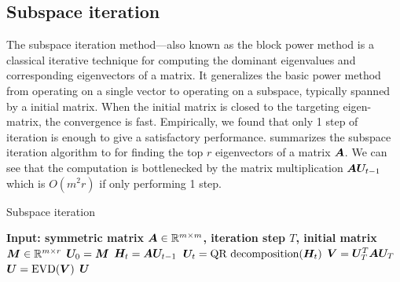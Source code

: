 \subsection{Subspace iteration}
\label{subapp: background subspace iteration}
The subspace iteration method—also known as the block power method is a classical iterative technique for computing the dominant eigenvalues and corresponding eigenvectors of a matrix. It generalizes the basic power method from operating on a single vector to operating on a subspace, typically spanned by a initial matrix. When the initial matrix is closed to the targeting eigen-matrix, the convergence is fast. Empirically, we found that only 1 step of iteration is enough to give a satisfactory performance.  summarizes the subspace iteration algorithm to for finding the top $r$ eigenvectors of a matrix ${\bm{A}}$. We can see that the computation is bottlenecked by the matrix multiplication ${\bm{A}}{\bm{U}}_{t-1}$ which is $O(m^2r)$ if only performing 1 step. 

\begin{algorithm}
    \caption{Subspace iteration}
    \label{alg: subspace iteration}
    \begin{algorithmic}
        \STATE \bfseries{Input:} symmetric matrix ${\bm{A}}\in\mathbb{R}^{m\times m}$, iteration step $T$, initial matrix ${\bm{M}}\in\mathbb{R}^{m\times r}$
        \STATE ${\bm{U}}_0={\bm{M}}$
        \STATE ${\bm{H}}_t = {\bm{A}}{\bm{U}}_{t-1}$
        \STATE ${\bm{U}}_t=\text{QR decomposition}({\bm{H}}_t)$
        \ENDFOR
        \STATE ${\bm{V}} = {\bm{U}}_T^T{\bm{A}}{\bm{U}}_T$
        \STATE ${\bm{U}} = \operatorname{EVD}({\bm{V}})$
         ${\bm{U}}$
    \end{algorithmic}
\end{algorithm}



